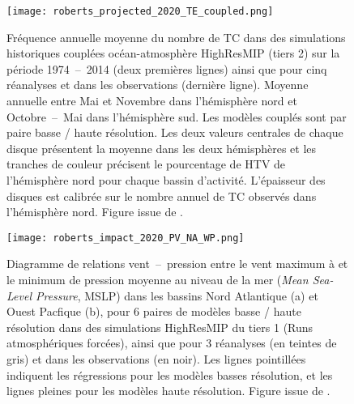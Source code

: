 \documentclass[../main.tex]{subfiles}
\begin{document}
\begin{figure}[tb]
    \centering
    \texttt{[image: roberts\_projected\_2020\_TE\_coupled.png]}
    \caption{Fréquence annuelle moyenne du nombre de TC dans des simulations historiques couplées océan-atmosphère HighResMIP (tiers 2) sur la période
        \num{1974}~--~\num{2014} (deux premières lignes) ainsi que pour cinq réanalyses et dans les observations (dernière ligne). Moyenne annuelle entre Mai et
        Novembre dans l'hémisphère nord et Octobre~--~Mai dans l'hémisphère sud. Les modèles couplés sont par paire basse / haute résolution. Les deux valeurs
        centrales de chaque disque présentent la moyenne dans les deux hémisphères et les tranches de couleur précisent le pourcentage de HTV de l'hémisphère
        nord pour chaque bassin d'activité. L'épaisseur des disques est calibrée sur le nombre annuel de TC observés dans l'hémisphère nord. Figure issue de
        \hbox{\textcite{roberts_projected_2020}}.}
        \label{fig:NTC_HighResMIP}
\end{figure}
\begin{figure}[tb]
    \centering
    \texttt{[image: roberts\_impact\_2020\_PV\_NA\_WP.png]}
    \caption{Diagramme de relations vent~--~pression entre le vent maximum à  et le minimum de pression moyenne au niveau de la mer (\textit{Mean
        Sea-Level Pressure}, MSLP) dans les bassins Nord Atlantique (a) et Ouest Pacfique (b), pour \num{6} paires de modèles basse / haute résolution dans des
        simulations HighResMIP du tiers \num{1} (Runs atmosphériques forcées), ainsi que pour \num{3} réanalyses (en teintes de gris) et dans les observations
        (en noir). Les lignes pointillées indiquent les régressions pour les modèles basses résolution, et les lignes pleines pour les modèles haute résolution.
        Figure issue de \hbox{\textcite{roberts_impact_2020}}.}
    \label{fig:roberts_PV_resolution}
\end{figure}
\end{document}
